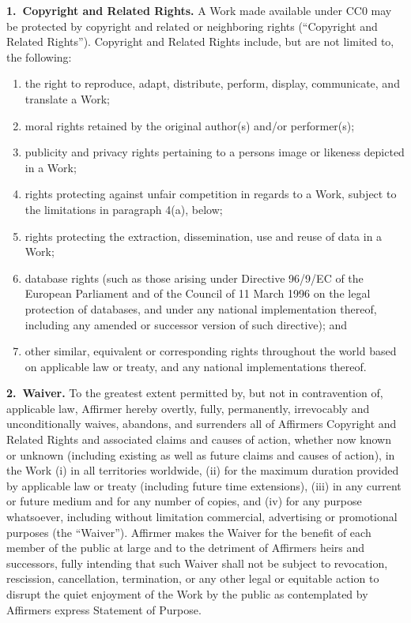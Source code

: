\textbf{1.~Copyright and Related Rights.}
A Work made available under CC0 may be protected by copyright and
related or neighboring rights (``Copyright and Related Rights'').
Copyright and Related Rights include, but are not limited to, the
following:
\begin{enumerate}[label={\roman*}.,ref={\roman*}]
    \item the right to reproduce, adapt, distribute, perform,
          display, communicate, and translate a Work;
    \item moral rights retained by the original author(s) and/or
          performer(s);
    \item publicity and privacy rights pertaining to a
          person\textquotesingle{}s image or likeness depicted in
          a Work;
    \item rights protecting against unfair competition in regards
          to a Work, subject to the limitations in paragraph 4(a),
          below;
    \item rights protecting the extraction, dissemination, use and
          reuse of data in a Work;
    \item database rights (such as those arising under Directive
          96/9/EC of the European Parliament and of the Council of
          11 March 1996 on the legal protection of databases, and
          under any national implementation thereof, including any
          amended or successor version of such directive); and
    \item other similar, equivalent or corresponding rights
          throughout the world based on applicable law or treaty,
          and any national implementations thereof.
\end{enumerate}

\textbf{2.~Waiver.}
To the greatest extent permitted by, but not in contravention of,
applicable law, Affirmer hereby overtly, fully, permanently,
irrevocably and unconditionally waives, abandons, and surrenders
all of Affirmer\textquotesingle{}s Copyright and Related Rights
and associated claims and causes of action, whether now known or
unknown (including existing as well as future claims and causes of
action), in the Work (i) in all territories worldwide, (ii) for
the maximum duration provided by applicable law or treaty
(including future time extensions), (iii) in any current or future
medium and for any number of copies, and (iv) for any purpose
whatsoever, including without limitation commercial, advertising
or promotional purposes (the ``Waiver''). Affirmer makes the
Waiver for the benefit of each member of the public at large and
to the detriment of Affirmer\textquotesingle{}s heirs and
successors, fully intending that such Waiver shall not be subject
to revocation, rescission, cancellation, termination, or any other
legal or equitable action to disrupt the quiet enjoyment of the
Work by the public as contemplated by Affirmer\textquotesingle{}s
express Statement of Purpose.

